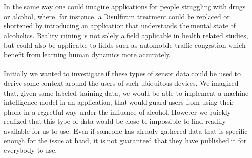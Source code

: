 \\\\
In the same way one could imagine applications for people struggling with drugs or alcohol, where, for instance, a Disulfiram \parencite{nlm_disulfiram} treatment could be replaced or shortened by introducing an application that understands the mental state of alcoholics. Reality mining is not solely a field applicable in health related studies, but could also be applicable to fields such as automobile traffic congestion \parencite{pentland2009reality_mining_mobile_communication_gps} which benefit from learning human dynamics more accurately.
\\\\
Initially we wanted to investigate if these types of sensor data could be used to derive some context around the users of such ubiquitous devices. We imagined that, given some labeled training data, we would be able to implement a machine intelligence model in an application, that would guard users from using their phone in a regretful way under the influence of alcohol. However we quickly realized that this type of data would be close to impossible to find readily available for us to use. Even if someone has already gathered data that is specific enough for the issue at hand, it is not guaranteed that they have published it for everybody to use.
